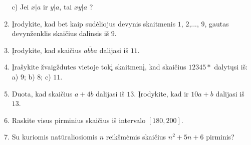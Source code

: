 \begin{enumerate}
    c) Jei $x|a$ ir $y|a$, tai $xy|a$ ?
  \item Įrodykite, kad bet kaip sudėliojus devynis skaitmenis
    $1$, $2$,..., $9$, gautas devynženklis skaičius dalinsis iš $9$.  
  \item Įrodykite, kad skaičius $\overline{abba}$ dalijasi iš $11$.  
  \item Įrašykite žvaigždutes vietoje tokį skaitmenį, kad skaičius $12345*$
    dalytųsi iš: a) $9$; b) $8$; c) $11$.  
  \item Duota, kad skaičius $a+4b$ dalijasi iš $13$. Įrodykite, kad ir
    $10a+b$ dalijasi iš $13$. 
 \item Raskite visus pirminius skaičius iš intervalo $[180, 200]$.  
  \item Su kuriomis natūraliosiomis $n$ reikšmėmis skaičius $n^2 + 5n + 6$
    pirminis?  

\end{enumerate}
